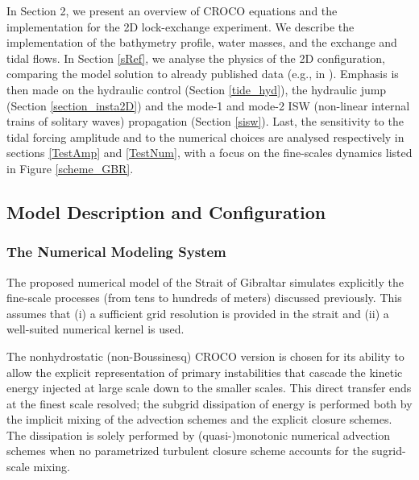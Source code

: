 In Section 2, we present an overview of CROCO equations and the implementation for the 2D lock-exchange experiment. We describe the implementation of the bathymetry profile, water masses, and the exchange and tidal flows. In Section \ref{sRef}, we analyse the physics of the 2D configuration, comparing the model solution to already published data  (e.g., in \citet{FA1988}). Emphasis is then made on the hydraulic control (Section \ref{tide_hyd}), the hydraulic jump (Section \ref{section_insta2D}) and the mode-1 and mode-2 ISW (non-linear internal trains of solitary waves) propagation (Section \ref{sisw}). Last, the sensitivity to the tidal forcing amplitude and to the numerical choices are analysed respectively in sections \ref{TestAmp} and \ref{TestNum}, with a focus on the fine-scales dynamics listed in Figure \ref{scheme_GBR}. 

\subsection{Model Description and Configuration}

\subsubsection{The Numerical Modeling System}

The proposed numerical model of the Strait of Gibraltar simulates explicitly the fine-scale processes (from tens to hundreds of meters) discussed previously. This assumes that (i) a sufficient grid resolution is provided in the strait and (ii) a well-suited numerical kernel is used.

The nonhydrostatic (non-Boussinesq) CROCO version is chosen for its ability to allow the explicit representation of primary instabilities that cascade the kinetic energy injected at large scale down to the smaller scales. This direct transfer ends at the finest scale resolved; the subgrid dissipation of energy is performed both by the implicit mixing of the advection schemes and the explicit closure schemes. The dissipation is solely performed by (quasi-)monotonic numerical advection schemes \citep{Grinstein2007}  when no parametrized turbulent closure scheme accounts for the sugrid-scale mixing.

